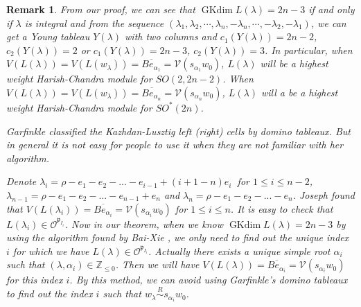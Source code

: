 \documentclass{amsart}[12pt]
\newtheorem{Rem}{Remark}[section]
\renewcommand{\subset}{\subseteq}
\newcommand{\gkd}{\operatorname{GKdim}}
\numberwithin{equation}{section}
\begin{document}
\begin{Rem}
From our proof, we can see that $\gkd L(\lambda)=2n-3$ if and only if $\lambda$ is integral and from the sequence
$
(\lambda_1,\lambda_2,\cdots,\lambda_n,-\lambda_n,\cdots,-\lambda_2,-\lambda_1)
$, we can get a Young tableau $Y(\lambda)$ with two columns and  $c_1(Y(\lambda))=2n-2$,  $c_2(Y(\lambda))=2$ or  $c_1(Y(\lambda))=2n-3$,  $c_2(Y(\lambda))=3$. In particular, when $V(L(\lambda))=V(L(w_{\lambda}))=\overline{Be_{\alpha_1}}=\mathcal{V}(s_{\alpha_1}w_0)$, $L(\lambda)$ will be a highest weight Harish-Chandra module for $SO(2,2n-2)$. When $V(L(\lambda))=V(L(w_{\lambda}))=\overline{Be_{\alpha_n}}=\mathcal{V}(s_{\alpha_n}w_0)$, $L(\lambda)$ will a be a highest weight Harish-Chandra module for  $SO^*(2n)$.



Garfinkle \cite{Ga1,Ga2,Ga3} classified the Kazhdan-Lusztig left (right) cells by domino tableaux. But in general it is not easy for people to use it when they are not familiar with her algorithm.

Denote   $\lambda_i=\rho-e_1-e_2-...-e_{i-1}+(i+1-n)e_{i}~$ for $1\leq i\leq n-2$, $\lambda_{n-1}=\rho-e_1-e_2-...-e_{n-1}+e_{n}$ and $\lambda_{n}=\rho-e_1-e_2-...-e_{n}$. Joseph \cite{Jo98} found that  $V(L(\lambda_i))=\overline{Be_{\alpha_{i}}}=\mathcal{V}(s_{\alpha_i}w_0)$ for $1\leq i\leq n$. It is easy to check that $L(\lambda_i)\in \mathscr{O}^{\mathfrak{p}_{I_i}}$. Now in our theorem, when we know $\gkd L(\lambda)=2n-3$ by using the algorithm found by Bai-Xie \cite{BX-2}, we only need to find out the unique index $i$ for which we have $L(\lambda)\in \mathscr{O}^{\mathfrak{p}_{I_i}}$. Actually there exists a unique simple root $\alpha_i$ such that $(\lambda,\alpha_i)\in \mathbb{Z}_{\leq 0}$. Then we will have $V(L(\lambda))=\overline{Be_{\alpha_{i}}}=\mathcal{V}(s_{\alpha_i}w_0)$ for this index $i$. By this method, we can avoid using Garfinkle's domino tableaux to find out the index $i$ such that
$w_{\lambda}\stackrel{R}{\sim}s_{\alpha_{i}}w_0$.





\end{Rem}


%
%
%
\end{document}

